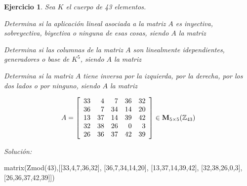 \documentclass[12pt]{amsart}
\newtheorem{ejer}{Ejercicio}
\begin{document}
\begin{ejer} Sea $K$ el cuerpo de 43 elementos.
\newline
\noindent\begin{minipage}{\textwidth}
\begin{tcolorbox}[colback = green!20!white,title=Versión Aplicaciones]
Determina si la aplicaci\'on lineal asociada a la matriz $A$ es inyectiva, sobreyectiva, biyectiva o ninguna de esas cosas, siendo $A$ la matriz \end{tcolorbox}
\end{minipage} \newline
\noindent\begin{minipage}{\textwidth}
\begin{tcolorbox}[colback = blue!20!white,title=Versión Vectores]
Determina si las columnas de la matriz $A$ son linealmente idependientes, generadores o base de $K^{5}$, siendo $A$ la matriz \end{tcolorbox}
\end{minipage} \newline
\noindent\begin{minipage}{\textwidth} 
\begin{tcolorbox}[colback = red!20!white,title=Versión Inversas]
Determina si la matriz $A$ tiene inversa por la izquierda, por la derecha, por los dos lados o por ninguno, siendo $A$ la matriz 
\end{tcolorbox}
\end{minipage}
\[ A = \left[\begin{array}{rrrrr}
33 & 4 & 7 & 36 & 32 \\
36 & 7 & 34 & 14 & 20 \\
13 & 37 & 14 & 39 & 42 \\
32 & 38 & 26 & 0 & 3 \\
26 & 36 & 37 & 42 & 39
\end{array}\right] \in {\bf M}_{5\times 5}({\mathbb Z}_{43})\]
\end{ejer}

{\it Soluci\'on:}

\begin{sageblock}
matrix(Zmod(43),[[33,4,7,36,32],
[36,7,34,14,20],
[13,37,14,39,42],
[32,38,26,0,3],
[26,36,37,42,39]])
\end{sageblock}

\end{document}
